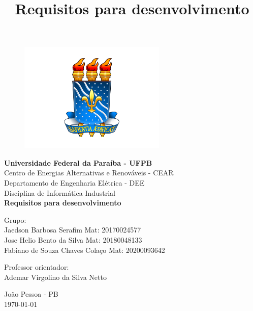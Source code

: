 \documentclass[a4paper,12pt]{article}
\begin{document}
\title{Requisitos para desenvolvimento}

\begin{titlepage}
	
    \begin{figure}[H]
        \begin{center}
            \includegraphics[width=7cm]{logouf.png}
        \end{center}
    \end{figure}
	
	\begin{center}
        \vspace{-1cm}
        \large{\textbf{Universidade Federal da Paraíba - UFPB}}\\
        \large{Centro de Energias Alternativas e Renováveis - CEAR}\\
        \large{Departamento de Engenharia Elétrica - DEE}\\
        \large{Disciplina de Informática Industrial}\\
        
        \vspace*{\fill}
        \Large\textbf{Requisitos para desenvolvimento}
        \vspace*{\fill}
        
        \normalsize
        \hfill Grupo: \\
        \hfill Jaedson Barbosa Serafim \hspace{20pt} Mat: 20170024577\\\hspace{20pt} 
        \hfill Jose Helio Bento da Silva \hspace{20pt} Mat: 20180048133\\\hspace{20pt} 
        \hfill Fabiano de Souza Chaves Colaço \hspace{20pt} Mat: 20200093642  \newline
        
        \hfill Professor orientador:\\
        \hfill Ademar Virgolino da Silva Netto
        
        \vspace{\fill}
        João Pessoa - PB\\
        \today
          
	\end{center}
\end{titlepage}
\end{document}
